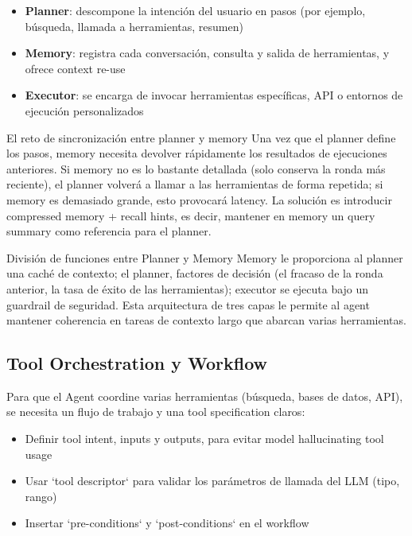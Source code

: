 \begin{itemize}
    \item \textbf{Planner}: descompone la intención del usuario en pasos (por ejemplo, búsqueda, llamada a herramientas, resumen)
    \item \textbf{Memory}: registra cada conversación, consulta y salida de herramientas, y ofrece context re-use
    \item \textbf{Executor}: se encarga de invocar herramientas específicas, API o entornos de ejecución personalizados
\end{itemize}

\begin{importantbox}{El reto de sincronización entre planner y memory}
Una vez que el planner define los pasos, memory necesita devolver rápidamente los resultados de ejecuciones anteriores. Si memory no es lo bastante detallada (solo conserva la ronda más reciente), el planner volverá a llamar a las herramientas de forma repetida; si memory es demasiado grande, esto provocará latency. La solución es introducir compressed memory + recall hints, es decir, mantener en memory un query summary como referencia para el planner.
\end{importantbox}
\begin{importantbox}{División de funciones entre Planner y Memory}
Memory le proporciona al planner una caché de contexto; el planner, factores de decisión (el fracaso de la ronda anterior, la tasa de éxito de las herramientas); executor se ejecuta bajo un guardrail de seguridad. Esta arquitectura de tres capas le permite al agent mantener coherencia en tareas de contexto largo que abarcan varias herramientas.
\end{importantbox}

\subsection{Tool Orchestration y Workflow}

Para que el Agent coordine varias herramientas (búsqueda, bases de datos, API), se necesita un flujo de trabajo y una tool specification claros:

\begin{itemize}
    \item Definir tool intent, inputs y outputs, para evitar model hallucinating tool usage
    \item Usar `tool descriptor` para validar los parámetros de llamada del LLM (tipo, rango)
    \item Insertar `pre-conditions` y `post-conditions` en el workflow
\end{itemize}

